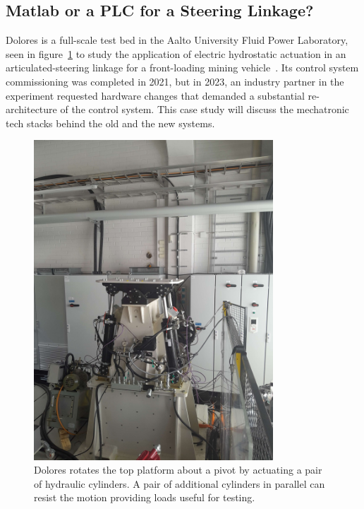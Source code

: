 \documentclass[english,12pt,a4paper,pdftex,eng,utf8]{aaltothesis}
\begin{document}
\subsection{Matlab or a PLC for a Steering Linkage?}

Dolores is a full-scale test bed in the Aalto University Fluid Power Laboratory, seen in figure~\ref{fig:dolores0} to study the application of electric hydrostatic actuation in an articulated-steering linkage for a front-loading mining vehicle~\cite{Hermansson2021, Helduser1999, Dudzinski1989}. Its control system commissioning was completed in 2021, but in 2023, an industry partner in the experiment requested hardware changes that demanded a substantial re-architecture of the control system. This case study will discuss the mechatronic tech stacks behind the old and the new systems.

\begin{figure}[h!]
  \centering
  \includegraphics[width=0.8\textwidth]{assets/dolores}
  \caption{Dolores rotates the top platform about a pivot by actuating a pair of hydraulic cylinders.  A pair of additional cylinders in parallel can resist the motion providing loads useful for testing.}\label{fig:dolores0}
\end{figure}
\end{document}
